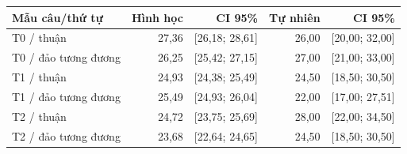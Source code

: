 \begin{tabular}{@{}lrrrr@{}}
\toprule
Mẫu câu/thứ tự & Hình học & CI 95\% & Tự nhiên & CI 95\% \\
\midrule
T0 / thuận & 27,36 & [26,18; 28,61] & 26,00 & [20,00; 32,00] \\
T0 / đảo tương đương & 26,25 & [25,42; 27,15] & 27,00 & [21,00; 33,00] \\
T1 / thuận & 24,93 & [24,38; 25,49] & 24,50 & [18,50; 30,50] \\
T1 / đảo tương đương & 25,49 & [24,93; 26,04] & 22,00 & [17,00; 27,51] \\
T2 / thuận & 24,72 & [23,75; 25,69] & 28,00 & [22,00; 34,50] \\
T2 / đảo tương đương & 23,68 & [22,64; 24,65] & 24,50 & [18,50; 30,50] \\
\bottomrule
\end{tabular}

